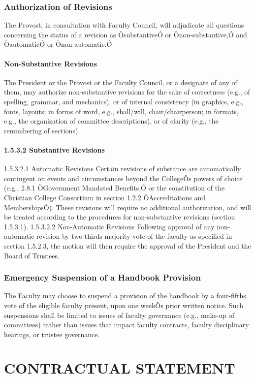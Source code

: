 \documentclass[letterpaper, 11pt]{article}
\begin{document}
		\subsubsection{Authorization of Revisions}
			The Provost, in consultation with Faculty Council, will adjudicate all questions concerning the status of a revision as ÒsubstantiveÓ or Ònon-substantive,Ó and ÒautomaticÓ or Ònon-automatic.Ó
			\paragraph{Non-Substantive Revisions}
				The President or the Provost or the Faculty Council, or a designate of any of them, may authorize non-substantive revisions for the sake of correctness (e.g., of spelling, grammar, and mechanics), or of internal consistency (in graphics, e.g., fonts, layouts; in forms of word, e.g., shall/will, chair/chairperson; in formats, e.g., the organization of committee descriptions), or of clarity (e.g., the renumbering of sections).
			\paragraph{1.5.3.2 Substantive Revisions}
				1.5.3.2.1 Automatic Revisions
				Certain revisions of substance are automatically contingent on events and circumstances beyond the CollegeÕs powers of choice (e.g., 2.8.1 ÒGovernment Mandated Benefits,Ó or the constitution of the Christian College Consortium in section 1.2.2 ÒAccreditations and MembershipsÓ). These revisions will require no additional authorization, and will be treated according to the procedures for non-substantive revisions (section 1.5.3.1).
				1.5.3.2.2 Non-Automatic Revisions
				Following approval of any non-automatic revision by two-thirds majority vote of the faculty as specified in section 1.5.2.3, the motion will then require the approval of the President and the Board of Trustees.
		\subsubsection{Emergency Suspension of a Handbook Provision}
			The Faculty may choose to suspend a provision of the handbook by a four-fifths vote of the eligible faculty present, upon one weekÕs prior written notice.  Such suspensions shall be limited to issues of faculty governance (e.g., make-up of committees) rather than issues that impact faculty contracts, faculty disciplinary hearings, or trustee governance.

\section{CONTRACTUAL STATEMENT}
	\label{sec:ContractualStatement}
\end{document}
